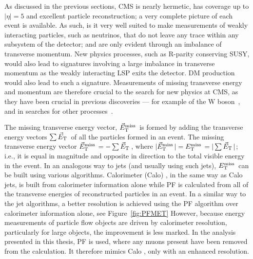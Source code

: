 As discussed in the previous sections, \ac{CMS} is nearly hermetic, has coverage up to $|\eta| = 5$ and excellent particle reconstruction; a very complete picture of each event is available. 
As such, is it very well suited to make measurements of weakly interacting particles, such as neutrinos, that do not leave any trace within any subsystem of the detector; and are only evident through an imbalance of transverse momentum.
New physics processes, such as R-parity conserving \ac{SUSY}, would also lead to signatures involving a large imbalance in transverse momentum as the weakly interacting \ac{LSP} exits the detector. \ac{DM} production would also lead to such a signature.
Measurements of missing transverse energy and momentum are therefore crucial to the search for new physics at \ac{CMS}, as they have been crucial in previous discoveries --- for example of the W boson~\cite{bib:Wdiscovery}, and in searches for other processes~\cite{Albajar:173124,Albajar:173125}. 

The missing transverse energy vector, $\vec{E}_{\text{T}}^{\text{miss}}\,$ is formed by adding the transverse energy vectors $\sum \vec{E}_{\text{T}}\,$ of all the particles formed in an event. The missing transverse energy vector $\vec{E}_{\text{T}}^{\text{miss}}\, = - \sum \vec{E}_{\text{T}}\,$, where $|\vec{E}_{\text{T}}^{\text{miss}}\,| = E_{\text{T}}^{\text{miss}}\, = |\sum \vec{E}_{\text{T}}\,|$; i.e., it is equal in magnitude and opposite in direction to the total visible energy in the event.
In an analogous way to jets (and usually using such jets), $E_{\text{T}}^{\text{miss}}\,$ can be built using various algorithms. 
Calorimeter (Calo) \MET, in the same way as Calo jets, is built from calorimeter information alone while
\ac{PF} \MET is calculated from all of the transverse energies of reconstructed particles in an event. 
In a similar way to the jet algorithms, a better resolution is achieved using the \ac{PF} algorithm over calorimeter information alone, see Figure~\ref{fig:PFMET}
However, because energy measurements of particle flow objects are driven by calorimeter resolution, particularly for large \ET objects, the improvement is less marked.
In the analysis presented in this thesis, \ac{PF} \MET is used, where any muons present have been removed from the  calculation. It therefore mimics Calo \MET, only with an enhanced resolution. 

